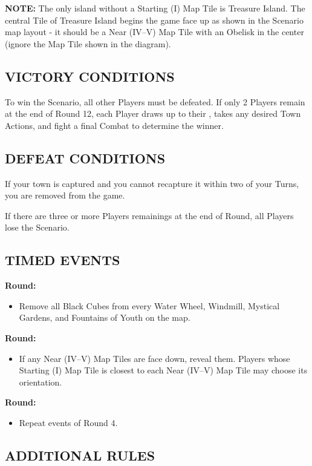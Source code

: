 \begin{multicols*}{2}
\textbf{\MakeUppercase{Note:}} The only island without a Starting (I) Map Tile is Treasure Island. The central Tile of Treasure Island begins the game face up as shown in the Scenario map layout - it should be a Near (IV--V) Map Tile with an Obelisk in the center (ignore the Map Tile shown in the diagram).

\subsection*{\MakeUppercase{Victory Conditions}}
To win the Scenario, all other Players must be defeated. If only 2 Players remain at the end of Round 12, each Player draws up to their , takes any desired Town Actions, and fight a final Combat to determine the winner.

\subsection*{\MakeUppercase{Defeat Conditions}}
If your town is captured and you cannot recapture it within two of your Turns, you are removed from the game.

If there are three or more Players remainings at the end of  Round, all Players lose the Scenario.

\subsection*{\MakeUppercase{Timed Events}}

\textbf{ Round:}
\begin{itemize}
  \item Remove all Black Cubes from every Water Wheel, Windmill, Mystical Gardens, and Fountains of Youth on the map.
\end{itemize}

\textbf{ Round:}
\begin{itemize}
  \item If any Near (IV--V) Map Tiles are face down, reveal them. Players whose Starting (I) Map Tile is closest to each Near (IV--V) Map Tile may choose its orientation.
\end{itemize}

\textbf{ Round:}
\begin{itemize}
  \item Repeat events of Round 4.
\end{itemize}

\subsection*{\MakeUppercase{Additional Rules}}


\end{multicols*}
